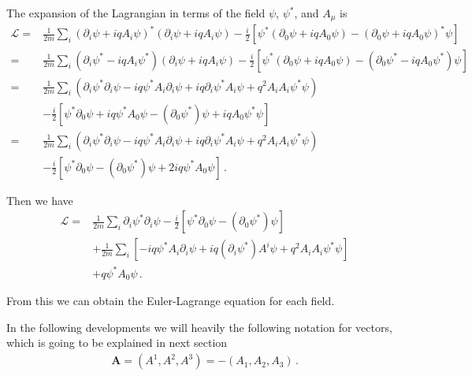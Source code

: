 The expansion of the Lagrangian in terms of the field $\psi$, $\psi^*$, and $A_\mu$ is 
\begin{align}
\label{eq:178qft}
   \mathcal{L}
=&\frac{1}{2m}\sum_i\left(\partial_i\psi+i q A_i\psi\right)^*\left(\partial_i\psi+i q A_i\psi\right)-\frac{i}{2}
  \left[\psi^*\left(\partial_0\psi+i q A_0\psi\right)-\left(\partial_0\psi+i q A_0\psi\right)^*\psi\right] 
\nonumber\\
=&\frac{1}{2m}\sum_i\left(\partial_i\psi^*-i q A_i\psi^*\right)\left(\partial_i\psi+i q A_i\psi\right)-\frac{i}{2}
  \left[\psi^*\left(\partial_0\psi+i q A_0\psi\right)-\left(\partial_0\psi^*-i q A_0\psi^*\right)\psi\right]
\nonumber\\
 =&\frac{1}{2m}\sum_i\left(\partial_i\psi^*\partial_i\psi-i q \psi^*A_i\partial_i\psi+i q \partial_i\psi^*A_i\psi+q^2A_i A_i \psi^*\psi\right)\nonumber\\
 &-\frac{i}{2}
  \left[\psi^*\partial_0\psi+i q \psi^*A_0\psi-(\partial_0\psi^*)\psi+i q A_0\psi^*\psi\right]\nonumber\\
 =&\frac{1}{2m}\sum_i\left(\partial_i\psi^*\partial_i\psi-i q \psi^*A_i\partial_i\psi+i q \partial_i\psi^*A_i\psi+q^2A_i A_i \psi^*\psi\right)\nonumber\\
 &-\frac{i}{2}
  \left[\psi^*\partial_0\psi-(\partial_0\psi^*)\psi+2 i q \psi^*A_0\psi\right]\,.
 \end{align}

Then we have
\begin{align}
  \mathcal{L}=&\frac{1}{2m}\sum_i\partial_i\psi^*\partial_i\psi
-\frac{i}{2}
  \left[\psi^*\partial_0\psi-(\partial_0\psi^*)\psi\right] \nonumber\\
&+\frac{1}{2m}\sum_i\left[ -i q \psi^*A_i\partial_i\psi+i q \left(\partial_i\psi^*\right) A^i\psi+q^2A_i A_i \psi^*\psi\right]\nonumber\\
 &+ q \psi^*A_0\psi\,.
 \end{align}

From this we can obtain the Euler-Lagrange equation for each field.

In the following developments we will heavily the following notation for vectors, which is going to be explained in next section
\begin{align*}
  \mathbf{A}=\left( A^1,A^2,A^3\right)=-\left( A_1,A_2,A_3\right)\,.
\end{align*}

